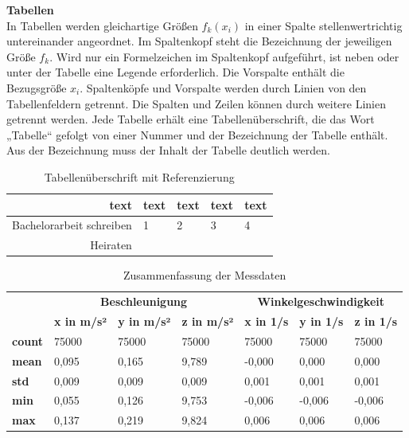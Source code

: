 \textbf{Tabellen}\\
In Tabellen werden gleichartige Größen $f_k(x_i)$ in einer Spalte stellenwertrichtig untereinander angeordnet. Im Spaltenkopf steht die Bezeichnung der jeweiligen Größe $f_k$. Wird nur ein Formelzeichen im Spaltenkopf aufgeführt, ist neben oder unter der Tabelle eine Legende erforderlich. Die Vorspalte enthält die Bezugsgröße $ x_i$. Spaltenköpfe und Vorspalte werden durch Linien von den Tabellenfeldern getrennt. Die Spalten und Zeilen können  durch weitere Linien getrennt werden. Jede Tabelle erhält eine Tabellenüberschrift, die das Wort „Tabelle“ gefolgt von einer Nummer und der Bezeichnung der Tabelle enthält. Aus der Bezeichnung muss der Inhalt der Tabelle deutlich werden. 


\newcommand{\cmark}{\ding{51}}%
\newcommand{\xmark}{\ding{55}}%

\setcounter{mytabfnValuee}{\value{footnote}}
\begin{table}[H]
\caption{ Tabellenüberschrift mit Referenzierung \cite{web}}
\label{Systemparametergnss}
\centering
\begin{tabularx}{\textwidth}{|r|X|X|X|X|}
\hline
\textbf{text} & \textbf{text} & \textbf{text} & \textbf{text} & \textbf{text}\\
\hline
Bachelorarbeit schreiben \footnotemark & 1 & 2 & 3 & 4\\
\hline
Heiraten & \xmark & \xmark & \cmark & \cmark \\
\hline
\end{tabularx}
\end{table}
    \footnotetext[\value{mytabfnValuee}]{%
       fast geschafft}%


\begin{table}[h]
\caption{Zusammenfassung der Messdaten}
\label{tab:zed_imu}
\begin{tabularx}{\textwidth}{|l|*{6}{X|}}
\hline
\textbf{} & \multicolumn{3}{c|}{\textbf{Beschleunigung}} & \multicolumn{3}{c|}{\textbf{Winkelgeschwindigkeit}} \\
\cline{2-7}
\textbf{ } & \textbf{x in m/s²} & \textbf{y in m/s²} & \textbf{z in m/s²} & \textbf{x in 1/s} & \textbf{y in 1/s} & \textbf{z in 1/s} \\
\hline
\textbf{count} & 75000 & 75000 & 75000 & 75000 & 75000 & 75000 \\
\hline
\textbf{mean} & 0,095 & 0,165 & 9,789 & -0,000 & 0,000 & 0,000 \\
\hline
\textbf{std} & 0,009 & 0,009 & 0,009 & 0,001 & 0,001 & 0,001 \\
\hline
\textbf{min} & 0,055 & 0,126 & 9,753 & -0,006 & -0,006 & -0,006 \\
\hline
\textbf{max} & 0,137 & 0,219 & 9,824 & 0,006 & 0,006 & 0,006 \\
\hline
\end{tabularx}
\end{table}
\vspace{0.2cm} %

